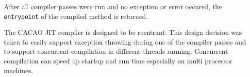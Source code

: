 After all compiler passes were run and no exception or error occured,
the \texttt{entrypoint} of the compiled method is returned.

The CACAO JIT compiler is designed to be reentrant. This design
decision was taken to easily support exception throwing during one of
the compiler passes and to support concurrent compilation in different
threads running. Concurrent compilation can speed up startup and run
time especially on multi processor machines.
